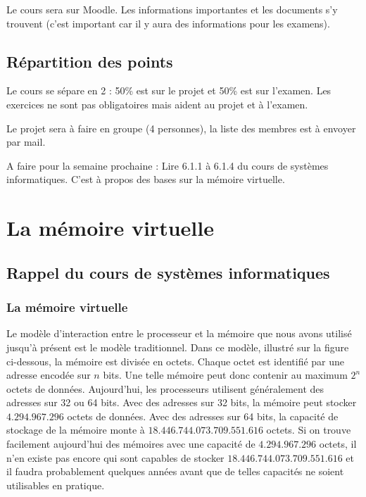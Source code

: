 Le cours sera sur Moodle. Les informations importantes et les documents
s'y trouvent (c'est important car il y aura des informations pour les
examens). \newline

\subsection{Répartition des points}

Le cours se sépare en 2 : 50\% est sur le projet et 50\% est sur
l'examen. Les exercices ne sont pas obligatoires mais aident au projet
et à l'examen. \newline

Le projet sera à faire en groupe (4 personnes), la liste des membres est
à envoyer par mail. \newline

A faire pour la semaine prochaine : Lire 6.1.1 à 6.1.4 du cours de
systèmes informatiques. C'est à propos des bases sur la mémoire
virtuelle. \newline


\section{La mémoire virtuelle}

\subsection{Rappel du cours de systèmes informatiques}

\subsubsection{La mémoire virtuelle}

Le modèle d'interaction entre le processeur et la mémoire que nous avons
utilisé jusqu'à présent est le modèle traditionnel. Dans ce modèle,
illustré sur la figure ci-dessous, la mémoire est divisée en octets.
Chaque octet est identifié par une adresse encodée sur $n$ bits.
Une telle mémoire peut donc contenir au maximum $2^{n}$ octets
de données. Aujourd'hui, les processeurs utilisent généralement des
adresses sur 32 ou 64 bits. Avec des adresses sur 32 bits, la mémoire
peut stocker $4.294.967.296$ octets de données. Avec des adresses
sur 64 bits, la capacité de stockage de la mémoire monte à
$18.446.744.073.709.551.616$ octets. Si on trouve facilement
aujourd'hui des mémoires avec une capacité de $4.294.967.296$
octets, il n'en existe pas encore qui sont capables de stocker
$18.446.744.073.709.551.616$ et il faudra probablement quelques
années avant que de telles capacités ne soient utilisables en pratique.
\newline

